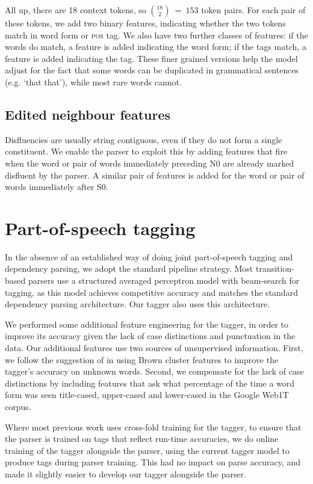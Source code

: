 \documentclass[11pt,letterpaper]{article}
\newcommand{\pos}{\textsc{pos}\xspace}
\newcommand{\szero}{S0\xspace}
\begin{document}
All up, there are 18 context tokens, so ${18 \choose 2}~=~153$ token pairs.
For each pair of these tokens, we add two binary features, indicating whether the
two tokens match in word form or \pos tag.  We also have two further classes of
features: if the words do match, a feature is added indicating the word form;
if the tags match, a feature is added indicating the tag. These finer grained
versions help the model adjust for the fact that some words can be duplicated
in grammatical sentences (e.g. `that that'), while most rare words cannot.

\subsection{Edited neighbour features}

Disfluencies are usually
string contiguous, even if they do not form a single constituent.  
We enable the parser to exploit this by adding features that fire when the word
or pair of words immediately preceding N0 are already marked disfluent by the parser.
A similar pair of features is
added for the word or pair of words immediately after \szero.


\section{Part-of-speech tagging}

In the absence of an established way of doing joint part-of-speech tagging and
dependency parsing, we adopt the standard pipeline strategy.  Most transition-based
parsers use a structured averaged perceptron model with beam-search for tagging,
as this model achieves competitive accuracy and matches the standard dependency
parsing architecture. Our tagger also uses this architecture.

We performed some additional feature engineering for the tagger, in order to
improve its accuracy given the lack of case distinctions and punctuation in
the data. Our additional features use two sources of unsupervised information.
First, we follow the suggestion of \citet{manning:11} in using Brown cluster
features to improve the tagger's accuracy on unknown words. Second, we compensate
for the lack of case distinctions by including features that ask what percentage
of the time a word form was seen title-cased, upper-cased and lower-cased in the
Google Web1T corpus. 

Where most previous work uses cross-fold training for the tagger, to ensure that the
parser is trained on tags that reflect run-time accuracies, we do online training
of the tagger alongside the parser, using the current tagger model to produce
tags during parser training.  This had no impact on parse accuracy, and made it
slightly easier to develop our tagger alongside the parser.
\end{document}
